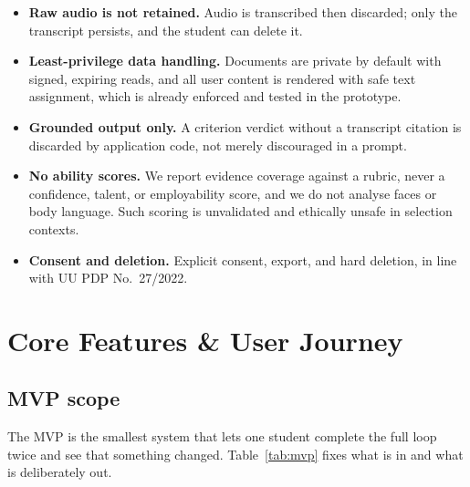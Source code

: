 \begin{itemize}
  \item \textbf{Raw audio is not retained.} Audio is transcribed then discarded;
        only the transcript persists, and the student can delete it.
  \item \textbf{Least-privilege data handling.} Documents are private by default
        with signed, expiring reads, and all user content is rendered with safe
        text assignment, which is already enforced and tested in the prototype.
  \item \textbf{Grounded output only.} A criterion verdict without a transcript
        citation is discarded by application code, not merely discouraged in a
        prompt.
  \item \textbf{No ability scores.} We report evidence coverage against a
        rubric, never a confidence, talent, or employability score, and we do
        not analyse faces or body language. Such scoring is unvalidated and
        ethically unsafe in selection contexts.
  \item \textbf{Consent and deletion.} Explicit consent, export, and hard
        deletion, in line with UU PDP No.\ 27/2022.
\end{itemize}


\section{Core Features \& User Journey}

\subsection{MVP scope}

The MVP is the smallest system that lets one student complete the full loop
twice and see that something changed. Table~\ref{tab:mvp} fixes what is in and
what is deliberately out.


